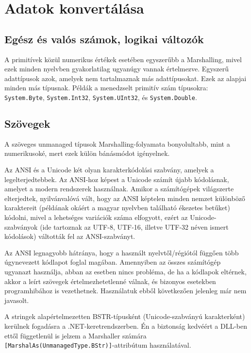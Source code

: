 \documentclass[tocnopagenum]{thesis-ekf}
\theoremstyle{definition}
\theoremstyle{remark}
\begin{document}
	\section{Adatok konvertálása}
	\subsection{Egész és valós számok, logikai változók}
	A primitívek közül numerikus értékek esetében egyszerűbb a Marshalling, mivel ezek minden nyelvben gyakorlatilag ugyanúgy vannak értelmezve.	Egyszerű adattípusok azok, amelyek nem tartalmaznak más adattípusokat. Ezek az alapjai minden más típusnak. Példák a menedzselt primitív szám típusokra: \verb*|System.Byte|, \verb*|System.Int32|, \verb*|System.UInt32|, és \verb*|System.Double|.
	\cite{marsh}
	\subsection{Szövegek}
	A szöveges unmanaged típusok Marshalling-folyamata bonyolultabb, mint a numerikusoké, mert ezek külön bánásmódot igényelnek.
	
	Az ANSI és a Unicode két olyan karakterkódolási szabvány, amelyek a legelterjedtebbek. Az ANSI-hoz képest a Unicode számít újabb kódolásnak, amelyet a modern rendszerek használnak. Amikor a számítógépek világszerte elterjedtek, nyilvánvalóvá vált, hogy az ANSI képtelen minden nemzet különböző karaktereit (példának okáért a magyar nyelvben található ékezetes betűket) kódolni, mivel a lehetséges variációk száma elfogyott, ezért az Unicode-szabványok (ide tartoznak az UTF-8, UTF-16, illetve UTF-32 néven ismert kódolások) váltották fel az ANSI-szabványt.
	
	Az ANSI legnagyobb hátránya, hogy a használt nyelvtől/régiótól függően több úgynevezett kódlapot foglal magában. Amennyiben az összes számítógép ugyanazt használja, abban az esetben nincs probléma, de ha a kódlapok eltérnek, akkor a leírt szövegek értelmezhetetlenné válnak, és bizonyos esetekben programhibához is vezethetnek. Használatuk ebből következően jelenleg már nem javasolt. \cite{ansi_unicode}
	
	A stringek alapértelmezetten BSTR-típusként (Unicode-szabványú karakterként) kerülnek fogadásra a .NET-keretrendszerben. Én a biztonság kedvéért a DLL-ben ettől függetlenül is jelzem a Marshaller számára \verb*|[MarshalAs(UnmanagedType.BStr)]|-attribútum használatával.
	
\end{document}
